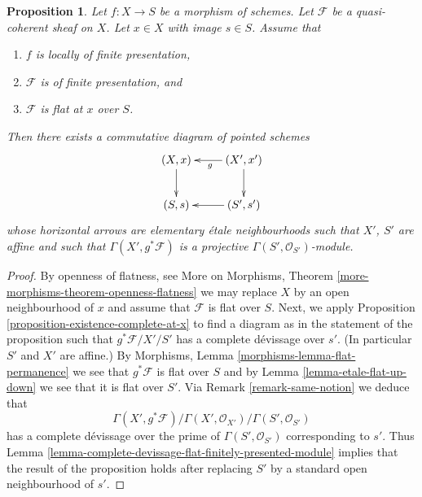 \documentclass[10pt,a4paper]{amsart}
\theoremstyle{plain}
\newtheorem{proposition}[subsection]{Proposition}
\theoremstyle{definition}
\theoremstyle{remark}
\numberwithin{equation}{subsection}
\begin{document}
\begin{proposition}
\label{proposition-finite-presentation-flat-at-point}
Let $f : X \to S$ be a morphism of schemes.
Let $\mathcal{F}$ be a quasi-coherent sheaf on $X$.
Let $x \in X$ with image $s \in S$.
Assume that
\begin{enumerate}
\item $f$ is locally of finite presentation,
\item $\mathcal{F}$ is of finite presentation, and
\item $\mathcal{F}$ is flat at $x$ over $S$.
\end{enumerate}
Then there exists a commutative diagram of pointed schemes
$$
\xymatrix{
(X, x) \ar[d] & (X', x') \ar[l]^g \ar[d] \\
(S, s) & (S', s') \ar[l]
}
$$
whose horizontal arrows are elementary \'etale neighbourhoods
such that $X'$, $S'$ are affine and such that
$\Gamma(X', g^*\mathcal{F})$ is a projective
$\Gamma(S', \mathcal{O}_{S'})$-module.
\end{proposition}

\begin{proof}
By openness of flatness, see
More on Morphisms, Theorem \ref{more-morphisms-theorem-openness-flatness}
we may replace $X$ by an open neighbourhood of $x$ and assume that
$\mathcal{F}$ is flat over $S$. Next, we apply
Proposition \ref{proposition-existence-complete-at-x}
to find a diagram as in the statement of the proposition such
that $g^*\mathcal{F}/X'/S'$ has a complete d\'evissage over $s'$.
(In particular $S'$ and $X'$ are affine.) By
Morphisms, Lemma \ref{morphisms-lemma-flat-permanence}
we see that $g^*\mathcal{F}$ is flat over $S$ and by
Lemma \ref{lemma-etale-flat-up-down}
we see that it is flat over $S'$. Via
Remark \ref{remark-same-notion}
we deduce that
$$
\Gamma(X', g^*\mathcal{F})/
\Gamma(X', \mathcal{O}_{X'})/
\Gamma(S', \mathcal{O}_{S'})
$$
has a complete d\'evissage over the prime of $\Gamma(S', \mathcal{O}_{S'})$
corresponding to $s'$. Thus
Lemma \ref{lemma-complete-devissage-flat-finitely-presented-module}
implies that the result of the proposition holds after replacing
$S'$ by a standard open neighbourhood of $s'$.
\end{proof}
\end{document}
